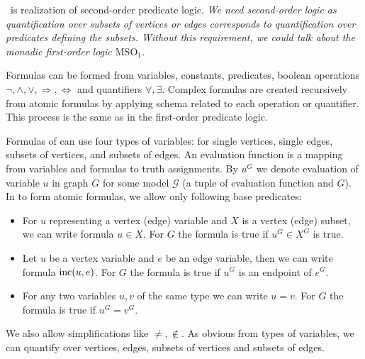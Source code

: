 \MSO{}~is realization of second-order predicate logic.
\emph{
	We need second-order logic as quantification over subsets of vertices or edges
	corresponds to quantification over predicates defining the subsets.
	Without this requirement, we could talk
	about the monadic first-order logic \( \text{MSO}_1 \).
}

Formulas can be formed from
variables, constants, predicates,
boolean operations \( \lnot, \land, \lor, \Rightarrow, \Leftrightarrow \)
and quantifiers \( \forall, \exists \).
Complex formulas are created recursively from atomic formulas
by applying schema related to each operation or quantifier.
This process is the same as in the first-order predicate logic.

Formulas of \MSO{} can use four types of variables:
for single vertices, single edges, subsets of vertices, and subsets of edges.
An evaluation function is a mapping from variables and formulas to truth assignments.
By \( u^G \) we denote evaluation of variable \( u \) in graph \( G \)
for some model \( \mathcal{G} \) (a tuple of evaluation function and \( G \)).
In \MSO{} to form atomic formulas, we allow only following base predicates:
%
\begin{itemize}
	\item For \( u \) representing a vertex (edge) variable
	      and \( X \) is a vertex (edge) subset,
	      we can write formula \( u \in X \).
	      For \( G \) the formula is true if \( u^G \in X^G \) is true.
	\item Let \( u \) be a vertex variable and \( e \) be an edge variable,
	      then we can write formula \( \text{inc} (u, e) \).
	      For \( G \) the formula is true if \( u^G \) is an endpoint of \( e^G \).
	\item For any two variables \( u, v \) of the same type we can write \( u = v \).
	      For \( G \) the formula is true if \( u^G = v^G \).
\end{itemize}
%
We also allow simplifications like \( \ne, \not\in \).
As obvious from types of variables, we can quantify over vertices, edges,
subsets of vertices and subsets of edges.

